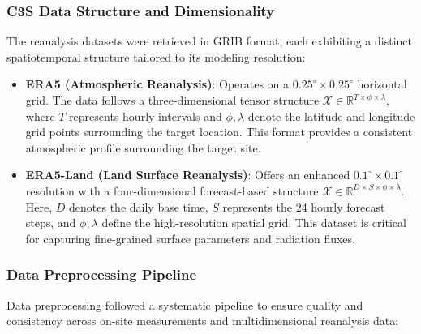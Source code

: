 \documentclass[conference]{IEEEtran}
\begin{document}
	\subsubsection{\textbf{C3S Data Structure and Dimensionality}}
	The reanalysis datasets were retrieved in GRIB format, each exhibiting a distinct spatiotemporal structure tailored to its modeling resolution:
	
	\begin{itemize}
		\item \textbf{ERA5 (Atmospheric Reanalysis)}: Operates on a $0.25^\circ \times 0.25^\circ$ horizontal grid. The data follows a three-dimensional tensor structure $\mathcal{X} \in \mathbb{R}^{T \times \phi \times \lambda}$, where $T$ represents hourly intervals and $\phi, \lambda$ denote the latitude and longitude grid points surrounding the target location. This format provides a consistent atmospheric profile surrounding the target site.
		\item \textbf{ERA5-Land (Land Surface Reanalysis)}: Offers an enhanced $0.1^\circ \times 0.1^\circ$ resolution with a four-dimensional forecast-based structure $\mathcal{X} \in \mathbb{R}^{D \times S \times \phi \times \lambda}$. Here, $D$ denotes the daily base time, $S$ represents the 24 hourly forecast steps, and $\phi, \lambda$ define the high-resolution spatial grid. This dataset is critical for capturing fine-grained surface parameters and radiation fluxes.
	\end{itemize}
	
	\subsubsection{\textbf{Data Preprocessing Pipeline}}
	Data preprocessing followed a systematic pipeline to ensure quality and consistency across on-site measurements and multidimensional reanalysis data:
	
\end{document}
